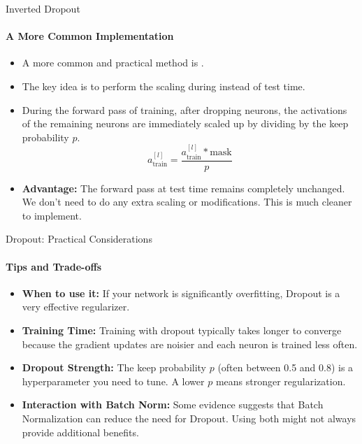 \begin{frame}{Inverted Dropout}
    \framesubtitle{A More Common Implementation}
    \begin{itemize}
        \item A more common and practical method is .
        \item The key idea is to perform the scaling during  instead of test time.
        \item During the forward pass of training, after dropping neurons, the activations of the remaining neurons are immediately scaled up by dividing by the keep probability $p$.
        \[ a^{[l]}_{\text{train}} = \frac{a^{[l]}_{\text{train}} * \text{mask}}{p} \]
        \item \textbf{Advantage:} The forward pass at test time remains completely unchanged. We don't need to do any extra scaling or modifications. This is much cleaner to implement.
    \end{itemize}
\end{frame}

\begin{frame}{Dropout: Practical Considerations}
    \framesubtitle{Tips and Trade-offs}
    \begin{itemize}
        \item \textbf{When to use it:} If your network is significantly overfitting, Dropout is a very effective regularizer.
        \item \textbf{Training Time:} Training with dropout typically takes longer to converge because the gradient updates are noisier and each neuron is trained less often.
        \item \textbf{Dropout Strength:} The keep probability $p$ (often between 0.5 and 0.8) is a hyperparameter you need to tune. A lower $p$ means stronger regularization.
        \item \textbf{Interaction with Batch Norm:} Some evidence suggests that Batch Normalization can reduce the need for Dropout. Using both might not always provide additional benefits.
    \end{itemize}
\end{frame}

